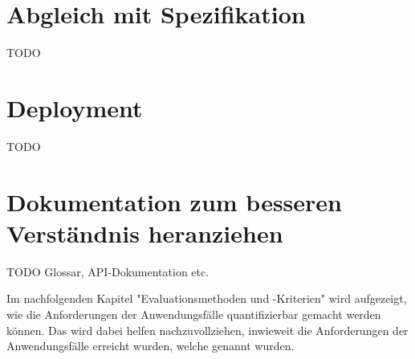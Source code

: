 \section{Abgleich mit Spezifikation}
TODO

\section{Deployment}
TODO

\section{Dokumentation zum besseren Verständnis heranziehen}
TODO Glossar, API-Dokumentation etc.

Im nachfolgenden Kapitel "Evaluationsmethoden und -Kriterien" wird aufgezeigt, wie die Anforderungen der Anwendungsfälle quantifizierbar gemacht werden können.
Das wird dabei helfen nachzuvollziehen, inwieweit die Anforderungen der Anwendungsfälle erreicht wurden, welche genannt wurden.
